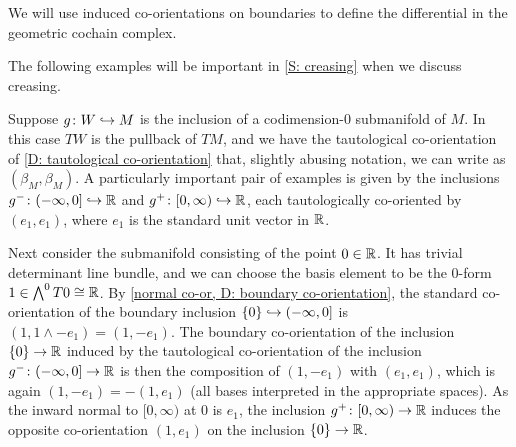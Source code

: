 We will use induced co-orientations on boundaries to define the differential in the geometric cochain complex.

The following examples will be important in \cref{S: creasing} when we discuss creasing.

\begin{example}\label{E: splitting example 1}
	Suppose $g \colon W \hookrightarrow M$ is the inclusion of a codimension-$0$ submanifold of $M$.
	In this case $TW$ is the pullback of $TM$, and we have the tautological co-orientation of \cref{D: tautological co-orientation} that, slightly abusing notation, we can write as $(\beta_M,\beta_M)$.
	A particularly important pair of examples is given by the inclusions $g^- \colon (-\infty, 0] \hookrightarrow \mathbb{R}$ and $g^+ \colon [0,\infty) \hookrightarrow \mathbb{R}$, each tautologically co-oriented by $(e_1,e_1)$, where $e_1$ is the standard unit vector in $\mathbb{R}$.

	Next consider the submanifold consisting of the point $0 \in \mathbb{R}$.
	It has trivial determinant line bundle, and we can choose the basis element to be the $0$-form $1 \in \bigwedge^0 T0 \cong \mathbb{R}$.
	By \cref{normal co-or, D: boundary co-orientation}, the standard co-orientation of the boundary inclusion $\{0\} \hookrightarrow (-\infty, 0]$ is $(1, 1 \wedge -e_1) = (1, -e_1)$.
	The boundary co-orientation of the inclusion $\{0\} \to \mathbb{R}$ induced by the tautological co-orientation of the inclusion $g^- \colon (-\infty, 0] \to \mathbb{R}$ is then the composition of $(1, -e_1)$ with $(e_1, e_1)$, which is again $(1,-e_1) = -(1,e_1)$ (all bases interpreted in the appropriate spaces).
	As the inward normal to $[0,\infty)$ at $0$ is $e_1$, the inclusion $g^+ \colon [0,\infty) \to \mathbb{R}$ induces the opposite co-orientation $(1, e_1)$ on the inclusion $\{0\} \to \mathbb{R}$.
\end{example}

